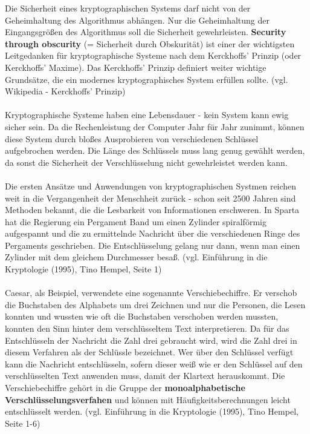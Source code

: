 \documentclass[11pt,a4paper]{report}
\begin{document}
Die Sicherheit eines kryptographischen Systems darf nicht von der Geheimhaltung des Algorithmus abhängen. Nur die Geheimhaltung der Eingangsgrößen des Algorithmus soll die Sicherheit gewehrleisten. \textbf{Security through obscurity} (= Sicherheit durch Obskurität) ist einer der wichtigsten Leitgedanken für kryptographische Systeme nach dem Kerckhoffs' Prinzip (oder Kerckhoffs' Maxime). Das Kerckhoffs' Prinzip definiert weiter wichtige Grundsätze, die ein modernes kryptographisches System erfüllen sollte. (vgl. Wikipedia - Kerckhoffs' Prinzip)\\\\

Kryptographische Systeme haben eine Lebensdauer - kein System kann ewig sicher sein. Da die Rechenleistung der Computer Jahr für Jahr zunimmt, können diese System durch bloßes Ausprobieren von verschiedenen Schlüssel aufgebrochen werden. Die Länge des Schlüssels muss lang genug gewählt werden, da sonst die Sicherheit der Verschlüsselung nicht gewehrleistet werden kann.\\\\

Die ersten Ansätze und Anwendungen von kryptographischen Systmen reichen weit in die Vergangenheit der Menschheit zurück - schon seit 2500 Jahren sind Methoden bekannt, die die Lesbarkeit von Informationen erschweren. In Sparta hat die Regierung ein Pergament Band um einen Zylinder spiralförmig aufgespannt und die zu ermittelnde Nachricht über die verschiedenen Ringe des Pergaments geschrieben. Die Entschlüsselung gelang nur dann, wenn man einen Zylinder mit dem gleichem Durchmesser besaß. (vgl. Einführung in die Kryptologie (1995), Tino Hempel, Seite 1)\\\\

Caesar, als Beispiel, verwendete eine sogenannte Verschiebechiffre. Er verschob die Buchstaben des Alphabets um drei Zeichnen und nur die Personen, die Lesen konnten und wussten wie oft die Buchstaben verschoben werden mussten, konnten den Sinn hinter dem verschlüsseltem Text interpretieren. Da für das Entschlüsseln der Nachricht die Zahl drei gebraucht wird, wird die Zahl drei in diesem Verfahren als der Schlüssle bezeichnet. Wer über den Schlüssel verfügt kann die Nachricht entschlüsseln, sofern dieser weiß wie er den Schlüssel auf den verschlüsselten Text anwenden muss, damit der Klartext herauskommt. Die Verschiebechiffre gehört in die Gruppe der \textbf{monoalphabetische Verschlüsselungsverfahen} und können mit Häufigkeitsberechnungen leicht entschlüsselt werden. (vgl. Einführung in die Kryptologie (1995), Tino Hempel, Seite 1-6)\\\\
\end{document}
